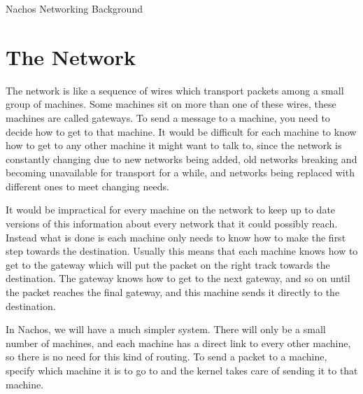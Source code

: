 

\begin{center}
{\large Nachos Networking Background}
\end{center}

\vspace{.2in}

\section{The Network}



The network is like a sequence of wires which transport packets among
a small group of machines.  Some machines sit on more than one of these
wires, these machines are called gateways.  To send a message to a machine,
you need to decide how to get to that machine.  It would be difficult for
each machine to know how to get to any other machine it might want to talk
to, since the network is constantly changing due to new networks being added,
old networks breaking and becoming unavailable for transport for a while,
and networks being replaced with different ones to meet changing needs.

It would be impractical for every machine on the network to keep up to date
versions of this information about every network that it could possibly reach.
Instead what is done is each machine only needs to know how to make the first
step towards the destination.  Usually this means that each machine knows
how to get to the gateway which will put the packet on the right track towards
the destination.  The gateway knows how to get to the next gateway, and
so on until the packet reaches the final gateway, and this machine
sends it directly to the destination.

In Nachos, we will have a much simpler system.  There will only be a
small number of machines, and each machine has a direct link to every
other machine, so there is no need for this kind of routing.  To send a
packet to a machine, specify which machine it is to go to and the
kernel takes care of sending it to that machine.

